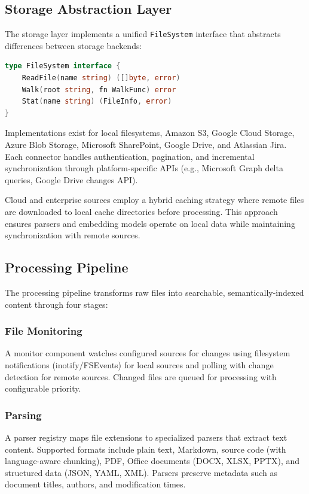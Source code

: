 \documentclass[conference]{IEEEtran}
\begin{document}
\subsection{Storage Abstraction Layer}

The storage layer implements a unified \texttt{FileSystem} interface that abstracts differences between storage backends:

\begin{lstlisting}[language=Go,basicstyle=\footnotesize\ttfamily]
type FileSystem interface {
    ReadFile(name string) ([]byte, error)
    Walk(root string, fn WalkFunc) error
    Stat(name string) (FileInfo, error)
}
\end{lstlisting}

Implementations exist for local filesystems, Amazon S3, Google Cloud Storage, Azure Blob Storage, Microsoft SharePoint, Google Drive, and Atlassian Jira. Each connector handles authentication, pagination, and incremental synchronization through platform-specific APIs (e.g., Microsoft Graph delta queries, Google Drive changes API).

Cloud and enterprise sources employ a hybrid caching strategy where remote files are downloaded to local cache directories before processing. This approach ensures parsers and embedding models operate on local data while maintaining synchronization with remote sources.

\subsection{Processing Pipeline}

The processing pipeline transforms raw files into searchable, semantically-indexed content through four stages:

\subsubsection{File Monitoring}
A monitor component watches configured sources for changes using filesystem notifications (inotify/FSEvents) for local sources and polling with change detection for remote sources. Changed files are queued for processing with configurable priority.

\subsubsection{Parsing}
A parser registry maps file extensions to specialized parsers that extract text content. Supported formats include plain text, Markdown, source code (with language-aware chunking), PDF, Office documents (DOCX, XLSX, PPTX), and structured data (JSON, YAML, XML). Parsers preserve metadata such as document titles, authors, and modification times.
\end{document}
